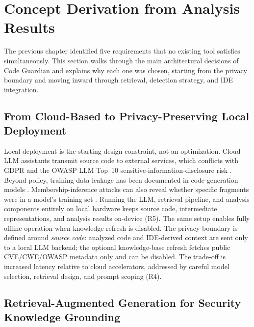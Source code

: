 \section{Concept Derivation from Analysis Results}
\label{sec:concept-derivation}

The previous chapter identified five requirements that no existing tool satisfies simultaneously. This section walks through the main architectural decisions of Code Guardian and explains why each one was chosen, starting from the privacy boundary and moving inward through retrieval, detection strategy, and IDE integration.

\subsection{From Cloud-Based to Privacy-Preserving Local Deployment}
\label{subsec:cloud-to-local}

Local deployment is the starting design constraint, not an optimization. Cloud LLM assistants transmit source code to external services, which conflicts with GDPR \cite{gdpr2016} and the OWASP LLM Top~10 sensitive-information-disclosure risk \cite{owaspLLMTop10_2023}. Beyond policy, training-data leakage has been documented in code-generation models \cite{carlini2021extracting,niu2023codexleaks}. Membership-inference attacks can also reveal whether specific fragments were in a model's training set \cite{shokri2017membership}. Running the LLM, retrieval pipeline, and analysis components entirely on local hardware keeps source code, intermediate representations, and analysis results on-device (R5). The same setup enables fully offline operation when knowledge refresh is disabled. The privacy boundary is defined around \emph{source code}: analyzed code and IDE-derived context are sent only to a local LLM backend; the optional knowledge-base refresh fetches public CVE/CWE/OWASP metadata only and can be disabled. The trade-off is increased latency relative to cloud accelerators, addressed by careful model selection, retrieval design, and prompt scoping (R4).

\subsection{Retrieval-Augmented Generation for Security Knowledge Grounding}
\label{subsec:rag-security}

